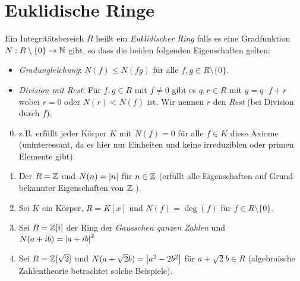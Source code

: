 \section{Euklidische Ringe}
\begin{definition}
	Ein Integritätsbereich $R$ heißt ein \emph{Euklidischer Ring} falls es eine Gradfunktion $N: R \setminus \{0\}  \to \mathbb{N}$ gibt,
	so dass die beiden folgenden Eigenschaften gelten:
	\begin{itemize}
		\item \emph{Gradungleichung}: $N(f) \leq N(fg)$ für alle $f,g \in R \setminus \{0\} $.
		\item \emph{Division mit Rest}: Für $f,g \in R$ mit $f \neq  0$ gibt es $q,r \in R$ mit $g = q\cdot f + r$ wobei $r = 0$ oder $N(r) < N(f)$ ist.
			Wir nennen $r$ den \emph{Rest} (bei Division durch $f $).
	\end{itemize}
\end{definition}

\begin{eg}
	\begin{enumerate}[1)]
		\setcounter{enumi}{-1}
		\item z.B. erfüllt jeder Körper $K$ mit $N(f) = 0$ für alle $f \in K$ diese Axiome
			(uninteressant, da es hier nur Einheiten und keine irreduziblen oder primen Elemente gibt).
		\item Der $R = \mathbb{Z}$ und $N(n) = \abs{n}$ für $n \in \mathbb{Z}$ (erfüllt alle Eigenschaften auf Grund bekannter Eigenschaften von $\mathbb{Z}$ ).
		\item Sei  $K$ ein Körper, $R=K[x]$ und $N(f) = \deg(f)$ für $f \in R \setminus \{0\} $.
		\item Sei $R = \mathbb{Z}[i]$ der Ring der \emph{Gausschen ganzen Zahlen} und $N(a+ib) = \abs{a+ib}^2$
		\item Sei $R = \mathbb{Z}[\sqrt{2}]$ und $N(a + \sqrt{2} b) = \abs{a^2 - 2 b^2}$ für $a + \sqrt{2} b \in R$ (algebraische Zahlentheorie betrachtet solche Beispiele).
	\end{enumerate}
\end{eg}

